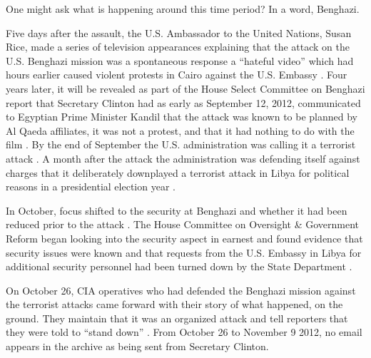 \documentclass[journal]{vgtc}                %
\begin{document}
One might ask what is happening around this time period?  In a word, Benghazi.  

Five days after the assault, the U.S. Ambassador to the United Nations, Susan Rice, made a series of television appearances explaining that the attack on the U.S. Benghazi mission was a spontaneous response a  ``hateful video''  which had hours earlier caused violent protests in Cairo against the U.S. Embassy \cite{faceTheNationSept16}.   Four years later, it will be revealed as part of the House Select Committee on Benghazi report \cite{BenghaziReport} that Secretary Clinton had as early as September 12, 2012, communicated to Egyptian Prime Minister Kandil that the attack was known to be planned by Al Qaeda affiliates, it was not a protest, and that it had nothing to do with the film \cite{ClintonAdmitsAttackSept12}.  By the end of September the U.S. administration was calling it a terrorist attack \cite{factCheckerBenghazi}.  A month after the attack the administration was defending itself against charges that it deliberately downplayed a terrorist attack in Libya for political reasons in a presidential election year \cite{susanRiceWashPost2012}.   

In October, focus shifted to the security at Benghazi and whether it had been reduced prior to the attack  \cite{cbsSecurity}.  The House Committee on Oversight \& Government Reform began looking into the security aspect \cite{cbsNewsHouseOversight2012} in earnest and found evidence that security issues were known and that requests from the U.S. Embassy in Libya for additional security personnel had been turned down by the State Department \cite{BenghaziSecurityTestimony}.  

On October 26, CIA operatives who had defended the Benghazi mission against the terrorist attacks came forward with their story of what happened, on the ground.  They maintain that it was an organized attack and tell reporters that they were told to ``stand down'' \cite{standDownOrder}.  From October 26 to November 9 2012, no email appears in the archive as being sent from Secretary Clinton.
\end{document}
